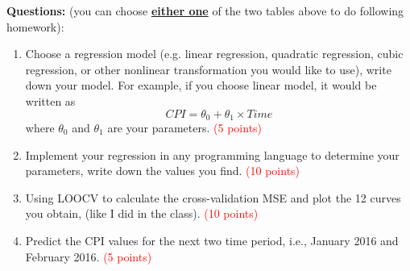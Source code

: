 \documentclass[11pt, nocap, fleqn,a4paper,twoside]{article}
\begin{document}
 {\bf Questions:} (you can choose \underline{\bf either one} of the two tables above to do following homework):
 \begin{enumerate}
 \item Choose a regression model (e.g. linear regression, quadratic regression, cubic regression, or other nonlinear transformation you would
 like to use), write down your model.  For example, if you choose linear model, it would be written as
 \[ CPI = \theta_0 + \theta_1 \times Time \]
 where $\theta_0$ and $\theta_1$ are your parameters. \textcolor{red}{(5 points)}
 \item Implement your regression in any programming language to determine your parameters, write down the values you find. \textcolor{red}{(10 points)}
 \item Using LOOCV to calculate the cross-validation MSE and plot the 12 curves you obtain, (like I did in the class). \textcolor{red}{(10 points)}
 \item Predict the CPI values for the next two time period, i.e., January 2016 and February 2016. \textcolor{red}{(5 points)}
 \end{enumerate}
\end{document}
